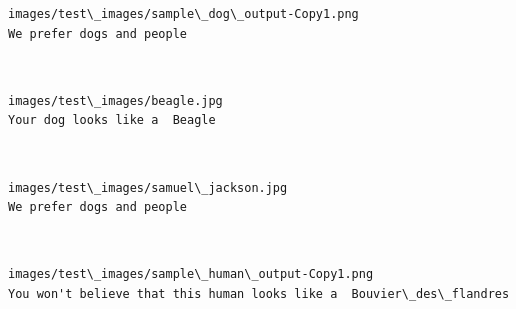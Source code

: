 \documentclass[11pt]{article}
\begin{document}
    \begin{Verbatim}[commandchars=\\\{\}]
images/test\_images/sample\_dog\_output-Copy1.png
We prefer dogs and people

    \end{Verbatim}

    \begin{center}
    \end{center}
    { \hspace*{\fill} \\}
    
    \begin{Verbatim}[commandchars=\\\{\}]
images/test\_images/beagle.jpg
Your dog looks like a  Beagle

    \end{Verbatim}

    \begin{center}
    \end{center}
    { \hspace*{\fill} \\}
    
    \begin{Verbatim}[commandchars=\\\{\}]
images/test\_images/samuel\_jackson.jpg
We prefer dogs and people

    \end{Verbatim}

    \begin{center}
    \end{center}
    { \hspace*{\fill} \\}
    
    \begin{Verbatim}[commandchars=\\\{\}]
images/test\_images/sample\_human\_output-Copy1.png
You won't believe that this human looks like a  Bouvier\_des\_flandres

    \end{Verbatim}

    \begin{center}
    \end{center}
    { \hspace*{\fill} \\}
    
\end{document}
